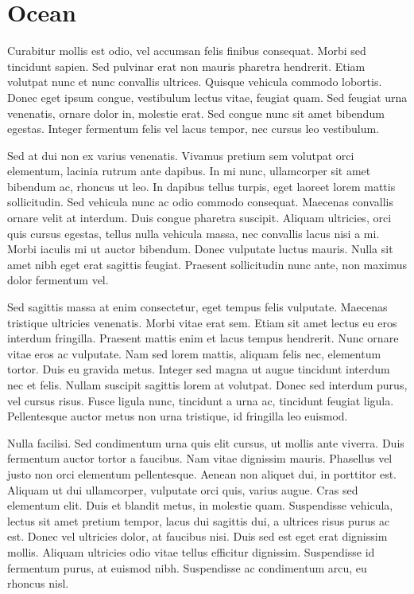 \documentclass[a4paper,12pt]{article}
\begin{document}
	
	
	\section{Ocean}
	
	Curabitur mollis est odio, vel accumsan felis finibus consequat. Morbi sed tincidunt sapien. Sed pulvinar erat non mauris pharetra hendrerit. Etiam volutpat nunc et nunc convallis ultrices. Quisque vehicula commodo lobortis. Donec eget ipsum congue, vestibulum lectus vitae, feugiat quam. Sed feugiat urna venenatis, ornare dolor in, molestie erat. Sed congue nunc sit amet bibendum egestas. Integer fermentum felis vel lacus tempor, nec cursus leo vestibulum.
	
	Sed at dui non ex varius venenatis. Vivamus pretium sem volutpat orci elementum, lacinia rutrum ante dapibus. In mi nunc, ullamcorper sit amet bibendum ac, rhoncus ut leo. In dapibus tellus turpis, eget laoreet lorem mattis sollicitudin. Sed vehicula nunc ac odio commodo consequat. Maecenas convallis ornare velit at interdum. Duis congue pharetra suscipit. Aliquam ultricies, orci quis cursus egestas, tellus nulla vehicula massa, nec convallis lacus nisi a mi. Morbi iaculis mi ut auctor bibendum. Donec vulputate luctus mauris. Nulla sit amet nibh eget erat sagittis feugiat. Praesent sollicitudin nunc ante, non maximus dolor fermentum vel.
	
	Sed sagittis massa at enim consectetur, eget tempus felis vulputate. Maecenas tristique ultricies venenatis. Morbi vitae erat sem. Etiam sit amet lectus eu eros interdum fringilla. Praesent mattis enim et lacus tempus hendrerit. Nunc ornare vitae eros ac vulputate. Nam sed lorem mattis, aliquam felis nec, elementum tortor. Duis eu gravida metus. Integer sed magna ut augue tincidunt interdum nec et felis. Nullam suscipit sagittis lorem at volutpat. Donec sed interdum purus, vel cursus risus. Fusce ligula nunc, tincidunt a urna ac, tincidunt feugiat ligula. Pellentesque auctor metus non urna tristique, id fringilla leo euismod.
	
	Nulla facilisi. Sed condimentum urna quis elit cursus, ut mollis ante viverra. Duis fermentum auctor tortor a faucibus. Nam vitae dignissim mauris. Phasellus vel justo non orci elementum pellentesque. Aenean non aliquet dui, in porttitor est. Aliquam ut dui ullamcorper, vulputate orci quis, varius augue. Cras sed elementum elit. Duis et blandit metus, in molestie quam. Suspendisse vehicula, lectus sit amet pretium tempor, lacus dui sagittis dui, a ultrices risus purus ac est. Donec vel ultricies dolor, at faucibus nisi. Duis sed est eget erat dignissim mollis. Aliquam ultricies odio vitae tellus efficitur dignissim. Suspendisse id fermentum purus, at euismod nibh. Suspendisse ac condimentum arcu, eu rhoncus nisl.\newpage
	
\end{document}

